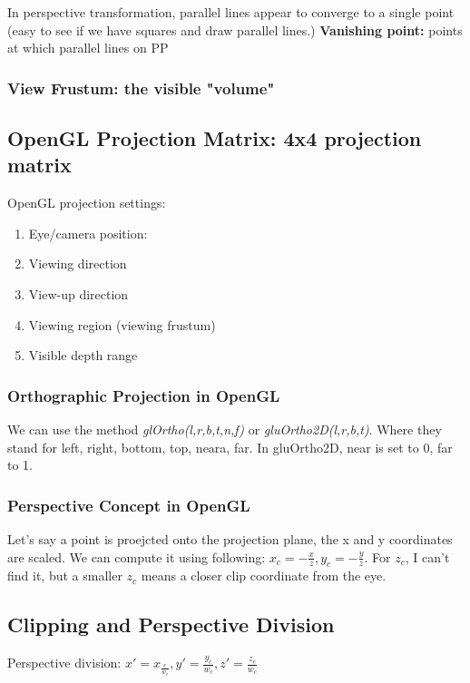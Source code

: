 \documentclass[11pt]{article}
\begin{document}
In perspective transformation, parallel lines appear to converge to a single point (easy to see if we have squares and draw parallel lines.)\newline
\textbf{Vanishing point: } points at which parallel lines on PP  

\subsubsection*{View Frustum: the visible "volume" }

\subsection{OpenGL Projection Matrix: 4x4 projection matrix}
OpenGL projection settings:
\begin{enumerate}
    \item Eye/camera position:
    \item Viewing direction
    \item View-up direction
    \item Viewing region (viewing frustum)
    \item Visible depth range
\end{enumerate}

\subsubsection*{Orthographic Projection in OpenGL}
We can use the method \textit{glOrtho(l,r,b,t,n,f)} or \textit{gluOrtho2D(l,r,b,t)}. Where they stand for left, right, bottom, top, neara, far. In gluOrtho2D, near is set to 0, far to 1.

\subsubsection*{Perspective Concept in OpenGL}
Let's say a point is proejcted onto the projection plane, the x and y coordinates are scaled. We can compute it using following: $x_c = -\frac{x}{z}, y_c = - \frac{y}{z}$. For $z_c$, I can't find it, but a smaller $z_c$ means a closer clip coordinate from the eye.    

\subsection{Clipping and Perspective Division}
Perspective division: $x' = x_\frac{c}{w_c}, y' = \frac{y_c}{w_c}, z' = \frac{z_c}{w_c}$ 
\end{document}
